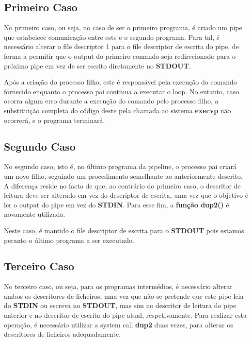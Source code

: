\documentclass[11.5pt,a4paper]{report}
\begin{document}
\subsection{Primeiro Caso}
No primeiro caso, ou seja, no caso de ser o primeiro programa, é criado um pipe que estabelece comunicação entre este e o segundo programa. Para tal, é necessário alterar o file descriptor 1 para o file descriptor de escrita do pipe, de forma a permitir que o output do primeiro comando seja redirecionado para o próximo pipe em vez de ser escrito diretamente no \textbf{STDOUT}.\par
Após a criação do processo filho, este é responsável pela execução do comando fornecido enquanto o processo pai continua a executar o loop. No entanto, caso ocorra algum erro durante a execução do comando pelo processo filho, a substituição completa do código deste pela chamada ao sistema \textbf{execvp} não ocorrerá, e o programa terminará.

\subsection{Segundo Caso}
No segundo caso, isto é, no último programa da pipeline, o processo pai criará um novo filho, seguindo um procedimento semelhante ao anteriormente descrito. A diferença reside no facto de que, ao contrário do primeiro caso, o descritor de leitura deve ser alterado em vez do descriptor de escrita, uma vez que o objetivo é ler o output do pipe em vez do \textbf{STDIN}. Para esse fim, a \textbf{função dup2()} é novamente utilizada.\par
Neste caso, é mantido o file descriptor de escrita para o \textbf{STDOUT} pois estamos peranto o último programa a ser executado.

\newpage

\subsection{Terceiro Caso}
No terceiro caso, ou seja, para os programas intermédios, é necessário alterar ambos os descritores de ficheiros, uma vez que não se pretende que este pipe leia do \textbf{STDIN} ou escreva no \textbf{STDOUT}, mas sim no descritor de leitura do pipe anterior e no descritor de escrita do pipe atual, respetivamente. Para realizar esta operação, é necessário utilizar a system call \textbf{dup2} duas vezes, para alterar os descritores de ficheiros adequadamente.\\
\end{document}
